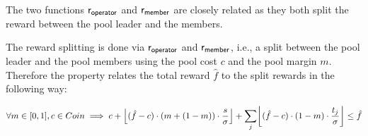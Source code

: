 The two functions $\mathsf{r_{operator}}$ and $\mathsf{r_{member}}$ are closely related as
they both split the reward between the pool leader and the members.

\begin{property}
  \label{prop:reward-splitting}

  The reward splitting is done via $\mathsf{r_{operator}}$ and $\mathsf{r_{member}}$, i.e.,
  a split between the pool leader and the pool members using the pool cost $c$
  and the pool margin $m$. Therefore the property relates the total reward
  $\hat{f}$ to the split rewards in the following way:

  \begin{multline*}
    \forall m\in [0,1], c\in Coin \implies c + \floor*{(\hat{f} - c)\cdot (m +
      (1 - m)) \cdot \frac{s}{\sigma}} + \sum_{j}\floor*{(\hat{f} -
      c)\cdot(1-m)\cdot\frac{t_{j}}{\sigma}} \leq \hat{f}
  \end{multline*}

\end{property}

\clearpage

